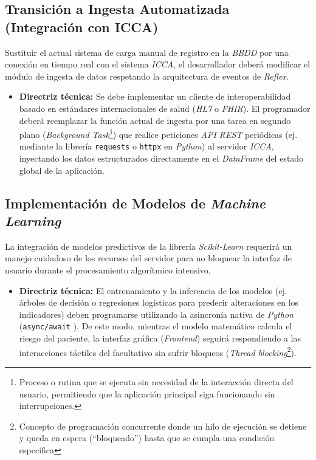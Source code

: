 \subsection{Transición a Ingesta Automatizada (Integración con ICCA)}
Sustituir el actual sistema de carga manual de registro en la \textit{BBDD} por una conexión en tiempo real con el sistema \textit{ICCA}, el desarrollador deberá modificar el módulo de ingesta de datos respetando la arquitectura de eventos de \textit{Reflex}.
\begin{itemize}
    \item \textbf{Directriz técnica:} Se debe implementar un cliente de interoperabilidad basado en estándares internacionales de salud (\textit{HL7} \cite{hl7} o \textit{FHIR}). El programador deberá reemplazar la función actual de ingesta por una tarea en segundo plano (\textit{Background Task}\footnote{Proceso o rutina que se ejecuta sin necesidad de la interacción directa del usuario, permitiendo que la aplicación principal siga funcionando sin interrupciones.}) que realice peticiones \textit{API REST} periódicas (ej. mediante la librería \texttt{requests} o \texttt{httpx} en \textit{Python}) al servidor \textit{ICCA}, inyectando los datos estructurados directamente en el \textit{DataFrame} del estado global de la aplicación.
\end{itemize}

\subsection{Implementación de Modelos de \textit{Machine Learning}}

La integración de modelos predictivos de la librería \textit{Scikit-Learn} requerirá un manejo cuidadoso de los recursos del servidor para no bloquear la interfaz de usuario durante el procesamiento algorítmico intensivo.
\begin{itemize}
    \item \textbf{Directriz técnica:} El entrenamiento y la inferencia de los modelos (ej. árboles de decisión o regresiones logísticas para predecir alteraciones en los indicadores) deben programarse utilizando la asincronía nativa de \textit{Python} (\texttt{async/await} \cite{await}). De este modo, mientras el modelo matemático calcula el riesgo del paciente, la interfaz gráfica (\textit{Frontend}) seguirá respondiendo a las interacciones táctiles del facultativo sin sufrir bloqueos (\textit{Thread blocking}\footnote{Concepto de programación concurrente donde un hilo de ejecución se detiene y queda en espera (``bloqueado'') hasta que se cumpla una condición específica}).
\end{itemize}

